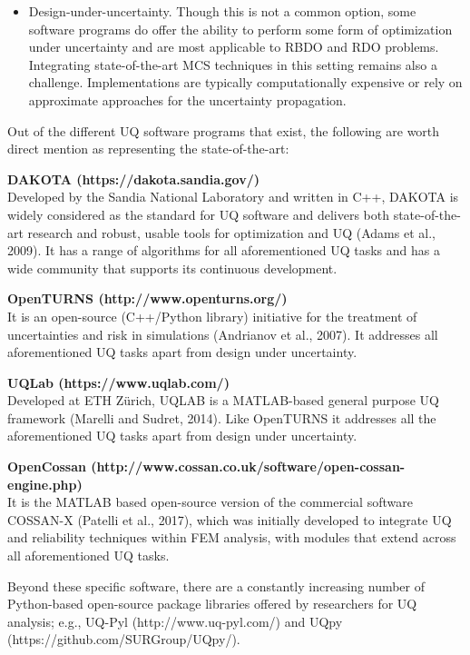 \begin{itemize}
    \item Design-under-uncertainty. Though this is not a common option, some software programs do offer the ability to perform some form of optimization under uncertainty and are most applicable to RBDO and RDO problems. Integrating state-of-the-art MCS techniques in this setting remains also a challenge. Implementations are typically computationally expensive or rely on approximate approaches for the uncertainty propagation.
\end{itemize}

\noindent Out of the different UQ software programs that exist, the following are worth direct mention as representing the state-of-the-art: 
\newline

\noindent\textbf{DAKOTA (https://dakota.sandia.gov/)} \\Developed by the Sandia National Laboratory and written in C++, DAKOTA is widely considered as the standard for UQ software and delivers both state-of-the-art research and robust, usable tools for optimization and UQ (Adams et al., 2009). It has a range of algorithms for all aforementioned UQ tasks and has a wide community that supports its continuous development. 
\newline

\noindent\textbf{OpenTURNS (http://www.openturns.org/)} \\It is an open-source (C++/Python library) initiative for the treatment of uncertainties and risk in simulations (Andrianov et al., 2007). It addresses all aforementioned UQ tasks apart from design under uncertainty. 
\newline

\noindent\textbf{UQLab (https://www.uqlab.com/)} \\Developed at ETH Zürich, UQLAB is a MATLAB-based general purpose UQ framework (Marelli and Sudret, 2014). Like OpenTURNS it addresses all the aforementioned UQ tasks apart from design under uncertainty. 
\newline

\noindent\textbf{OpenCossan (http://www.cossan.co.uk/software/open-cossan-engine.php)} \\It is the MATLAB based open-source version of the commercial software COSSAN-X (Patelli et al., 2017), which was initially developed to integrate UQ and reliability techniques within FEM analysis, with modules that extend across all aforementioned UQ tasks.

Beyond these specific software, there are a constantly increasing number of Python-based open-source package libraries offered by researchers for UQ analysis; e.g., UQ-Pyl (http://www.uq-pyl.com/) and UQpy (https://github.com/SURGroup/UQpy/).
